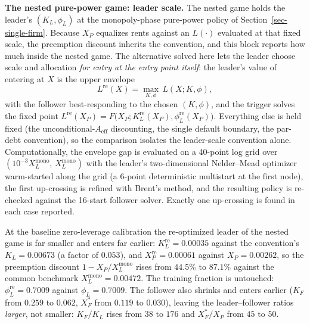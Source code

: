 \documentclass[
  11pt,
  letterpaper,
]{scrartcl}
\begin{document}
\textbf{The nested pure-power game: leader scale.} The nested game holds
the leader's \((K_L, \phi_L)\) at the monopoly-phase pure-power policy
of Section~\ref{sec-single-firm}. Because \(X_P\) equalizes rents
against an \(L(\cdot)\) evaluated at that fixed scale, the preemption
discount inherits the convention, and this block reports how much inside
the nested game. The alternative solved here lets the leader choose
scale and allocation \emph{for entry at the entry point itself}: the
leader's value of entering at \(X\) is the upper envelope \[
L^{\text{re}}(X) = \max_{K, \phi}\, L(X; K, \phi),
\] with the follower best-responding to the chosen \((K, \phi)\), and
the trigger solves the fixed point
\(L^{\text{re}}(X_P) = F\bigl(X_P; K_L^{\text{re}}(X_P), \phi_L^{\text{re}}(X_P)\bigr)\).
Everything else is held fixed (the unconditional-\(A_{\text{eff}}\)
discounting, the single default boundary, the par-debt convention), so
the comparison isolates the leader-scale convention alone.
Computationally, the envelope gap is evaluated on a 40-point log grid
over \((10^{-3} X_L^{\text{mono}},\, X_L^{\text{mono}})\) with the
leader's two-dimensional Nelder--Mead optimizer warm-started along the
grid (a 6-point deterministic multistart at the first node), the first
up-crossing is refined with Brent's method, and the resulting policy is
re-checked against the 16-start follower solver. Exactly one up-crossing
is found in each case reported.

At the baseline zero-leverage calibration the re-optimized leader of the
nested game is far smaller and enters far earlier:
\(K_L^{\text{re}} = 0.00035\) against the convention's \(K_L = 0.00673\)
(a factor of \(0.053\)), and \(X_P^{\text{re}} = 0.00061\) against
\(X_P = 0.00262\), so the preemption discount
\(1 - X_P/X_L^{\text{mono}}\) rises from \(44.5\%\) to \(87.1\%\)
against the common benchmark \(X_L^{\text{mono}} = 0.00472\). The
training fraction is untouched: \(\phi_L^{\text{re}} = 0.7009\) against
\(\phi_L = 0.7009\). The follower also shrinks and enters earlier
(\(K_F\) from \(0.259\) to \(0.062\), \(X_F^*\) from \(0.119\) to
\(0.030\)), leaving the leader--follower ratios \emph{larger}, not
smaller: \(K_F/K_L\) rises from \(38\) to \(176\) and \(X_F^*/X_P\) from
\(45\) to \(50\).
\end{document}
